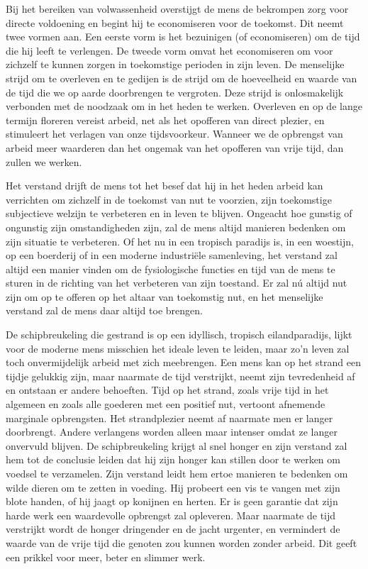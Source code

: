 \documentclass[
  a5paper,
  smalldemyvopaper,11pt,twoside,onecolumn,openright,extrafontsizes,
hidelinks]{memoir}
\begin{document}
Bij het bereiken van volwassenheid overstijgt de mens de bekrompen zorg
voor directe voldoening en begint hij te economiseren voor de toekomst.
Dit neemt twee vormen aan. Een eerste vorm is het bezuinigen (of
economiseren) om de tijd die hij leeft te verlengen. De tweede vorm
omvat het economiseren om voor zichzelf te kunnen zorgen in toekomstige
perioden in zijn leven. De menselijke strijd om te overleven en te
gedijen is de strijd om de hoeveelheid en waarde van de tijd die we op
aarde doorbrengen te vergroten. Deze strijd is onlosmakelijk verbonden
met de noodzaak om in het heden te werken. Overleven en op de lange
termijn floreren vereist arbeid, net als het opofferen van direct
plezier, en stimuleert het verlagen van onze tijdsvoorkeur. Wanneer we
de opbrengst van arbeid meer waarderen dan het ongemak van het opofferen
van vrije tijd, dan zullen we werken.

Het verstand drijft de mens tot het besef dat hij in het heden arbeid
kan verrichten om zichzelf in de toekomst van nut te voorzien, zijn
toekomstige subjectieve welzijn te verbeteren en in leven te blijven.
Ongeacht hoe gunstig of ongunstig zijn omstandigheden zijn, zal de mens
altijd manieren bedenken om zijn situatie te verbeteren. Of het nu in
een tropisch paradijs is, in een woestijn, op een boerderij of in een
moderne industriële samenleving, het verstand zal altijd een manier
vinden om de fysiologische functies en tijd van de mens te sturen in de
richting van het verbeteren van zijn toestand. Er zal nú altijd nut zijn
om op te offeren op het altaar van toekomstig nut, en het menselijke
verstand zal de mens daar altijd toe brengen.

De schipbreukeling die gestrand is op een idyllisch, tropisch
eilandparadijs, lijkt voor de moderne mens misschien het ideale leven te
leiden, maar zo'n leven zal toch onvermijdelijk arbeid met zich
meebrengen. Een mens kan op het strand een tijdje gelukkig zijn, maar
naarmate de tijd verstrijkt, neemt zijn tevredenheid af en ontstaan er
andere behoeften. Tijd op het strand, zoals vrije tijd in het algemeen
en zoals alle goederen met een positief nut, vertoont afnemende
marginale opbrengsten. Het strandplezier neemt af naarmate men er langer
doorbrengt. Andere verlangens worden alleen maar intenser omdat ze
langer onvervuld blijven. De schipbreukeling krijgt al snel honger en
zijn verstand zal hem tot de conclusie leiden dat hij zijn honger kan
stillen door te werken om voedsel te verzamelen. Zijn verstand leidt hem
ertoe manieren te bedenken om wilde dieren om te zetten in voeding. Hij
probeert een vis te vangen met zijn blote handen, of hij jaagt op
konijnen en herten. Er is geen garantie dat zijn harde werk een
waardevolle opbrengst zal opleveren. Maar naarmate de tijd verstrijkt
wordt de honger dringender en de jacht urgenter, en vermindert de waarde
van de vrije tijd die genoten zou kunnen worden zonder arbeid. Dit geeft
een prikkel voor meer, beter en slimmer werk.
\end{document}
